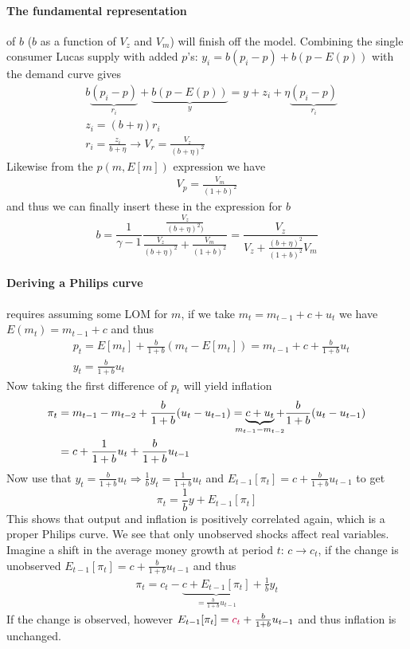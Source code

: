\documentclass[12pt, a4paper]{article}
\begin{document}
\begin{spacing}{1.213}
\paragraph{The fundamental representation} of $b$ ($b$ as a function of $V_z$ and $V_m$) will finish off the model. Combining the single consumer Lucas supply with added $p$'s: $y_i = b(p_i-p) + b(p - E(p))$ with the demand curve gives
\begin{align}
& b\underbrace{(p_i-p)}_{r_i} + \underbrace{b(p - E(p))}_{y} = y + z_i + \eta \underbrace{ (p_i - p)}_{r_i} \\
& z_i = (b+ \eta)r_i \\
& r_i = \frac{z_i}{b+ \eta} \rightarrow V_r = \frac{V_z}{(b+ \eta)^2}
\end{align}
Likewise from the $p(m, E[m])$ expression we have
\begin{align*}
V_p = \frac{V_m}{(1+b)^2}
\end{align*}
and thus we can finally insert these in the expression for $b$
\begin{equation}
b = \frac{1}{\gamma -1 } \frac{ \frac{V_z}{(b+\eta)^2)} }{ \frac{V_z}{(b+\eta)^2} + \frac{V_m}{(1+b)^2} } = \frac{V_z}{V_z + \frac{(b + \eta)^2}{(1+b)^2} V_m}
\end{equation}

\paragraph{Deriving a Philips curve} requires assuming some LOM for $m$, if we take $m_t = m_{t-1} + c + u_t$ we have $E(m_t)=m_{t-1}+c$ and thus
\begin{align*}
&p_t  = E[m_t] + \frac{b}{1+b}(m_t- E[m_t]) = m_{t-1} + c + \frac{b}{1+b} u_t \\
& y_t  = \frac{b}{1+b} u_t
\end{align*}
Now taking the first difference of $p_t$ will yield inflation
\begin{align*}
\pi_t &= m_{t-1} - m_{t-2} + \frac{b}{1+b}(u_t -u_{t-1}) = \underbrace{c + u_{t}}_{\mathclap{m_{t-1}-m_{t-2}}} + \frac{b}{1+b}(u_t -u_{t-1} )
\\
&= c + \frac{1}{1+b}u_t + \frac{b}{1+b}u_{t-1}
\end{align*}
Now use that $y_t  = \frac{b}{1+b} u_t \Rightarrow \frac{1}{b}y_t = \frac{1}{1+b}u_t$ and $E_{t-1}[\pi_t] = c +\frac{b}{1+b}u_{t-1}$ to get
\begin{equation}
\pi_t = \frac{1}{b}y + E_{t-1}[\pi_t]
\end{equation}
This shows that output and inflation is positively correlated again, which is a proper Philips curve. We see that only unobserved shocks affect real variables. Imagine a shift in the average money growth at period $t$: $c \rightarrow c_t$, if the change is unobserved $E_{t-1}[\pi_t] = c + \frac{b}{1+b}u_{t-1}$ and thus
\begin{align*}
\pi_t = c_t - \underbrace{c + E_{t-1}[\pi_t]}_{= \frac{b}{1+b}u_{t-1}} + \frac{1}{b}y_t
\end{align*}
If the change is observed, however $E_{t-1}[\pi_t] = \textcolor{purple}{c_t} + \frac{b}{1+b}u_{t-1}$ and thus inflation is unchanged.


\end{spacing}
\end{document}
